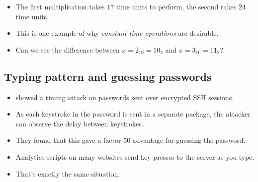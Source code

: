 \begin{frame}
  \begin{remark}
    \begin{itemize}
      \item The first multiplication takes \(17\) time units to perform,
        the second takes \(24\) time units.

      \item This is one example of why \emph{constant-time operations} are 
        desirable.
    \end{itemize}
  \end{remark}

  \pause

  \begin{exercise}
    \begin{itemize}
      \item Can we see the difference between \(x = 2_{10} = 10_2\) and \(x = 
          3_{10} = 11_2\)?
    \end{itemize}
  \end{exercise}
\end{frame}

\subsection{Typing pattern and guessing passwords}

\begin{frame}
  \begin{example}
    \begin{itemize}
      \item \Textcite{song2001timing} showed a timing attack on passwords sent 
        over encrypted SSH sessions.

      \item As each keystroke in the password is sent in a separate package, 
        the attacker can observe the delay between keystrokes.

      \item They found that this gave a factor 50 advantage for guessing the 
        password.
    \end{itemize}
  \end{example}
\end{frame}

\begin{frame}
  \begin{remark}
    \begin{itemize}
      \item Analytics scripts on many websites send key-presses to the server as 
        you type.
      \item That's exactly the same situation.
    \end{itemize}
  \end{remark}
\end{frame}


